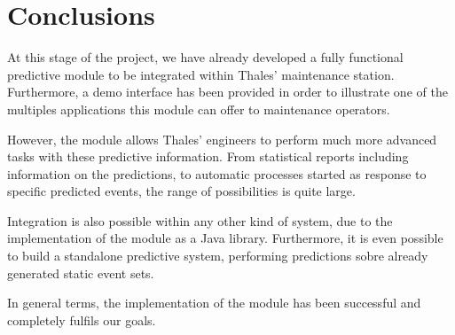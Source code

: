 \clearpage

\section{Conclusions}
At this stage of the project, we have already developed a fully functional predictive module to be integrated within Thales' maintenance station. Furthermore, a demo interface has been provided in order to illustrate one of the multiples applications this module can offer to maintenance operators.

However, the module allows Thales' engineers to perform much more advanced tasks with these predictive information. From statistical reports including information on the predictions, to automatic processes started as response to specific predicted events, the range of possibilities is quite large.

Integration is also possible within any other kind of system, due to the implementation of the module as a Java library. Furthermore, it is even possible to build a standalone predictive system, performing predictions sobre already generated static event sets.

In general terms, the implementation of the module has been successful and completely fulfils our goals.

\clearpage
